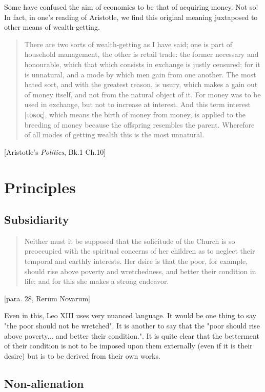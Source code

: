 \documentclass[letterpaper]{article}
\begin{document}
Some have confused the aim of economics to be that of acquiring money. Not so! In fact, in one's reading of Aristotle, we find this original meaning juxtaposed to other means of wealth-getting.

\begin{quote}
  There are two sorts of wealth-getting as I have said; one is part of household management, the other is retail trade: the former necessary and honourable, which that which consists in exchange is justly censured; for it is unnatural, and a mode by which men gain from one another. The most hated sort, and with the greatest reason, is usury, which makes a gain out of money itself, and not from the natural object of it. For money was to be used in exchange, but not to increase at interest. And this term interest [τοκος], which means the birth of money from money, is applied to the breeding of money because the offspring resembles the parent. Wherefore of all modes of getting wealth this is the most unnatural.
\end{quote} [Aristotle's \textit{Politics}, Bk.1 Ch.10]

\section{Principles}

\subsection{Subsidiarity}

\begin{quote}
  Neither must it be supposed that the solicitude of the Church is so preoccupied with the spiritual concerns of her children as to neglect their temporal and earthly interests. Her dsire is that the poor, for example, should rise above poverty and wretchedness, and better their condition in life; and for this she makes a strong endeavor.
\end{quote} [para. 28, Rerum Novarum]

Even in this, Leo XIII uses very nuanced language. It would be one thing to say "the poor should not be wretched". It is another to say that the "poor should rise above poverty... and better their condition.".  It is quite clear that the betterment of their condition is not to be imposed upon them externally (even if it is their desire) but is to be derived from their own works.

\subsection{Non-alienation}
\end{document}
